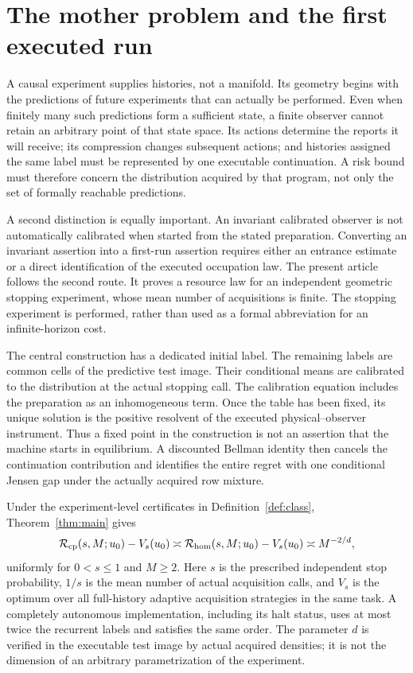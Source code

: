\section{The mother problem and the first executed run}\label{sec:introduction}
A causal experiment supplies histories, not a manifold. Its geometry begins with the predictions of future experiments that can actually be performed. Even when finitely many such predictions form a sufficient state, a finite observer cannot retain an arbitrary point of that state space. Its actions determine the reports it will receive; its compression changes subsequent actions; and histories assigned the same label must be represented by one executable continuation. A risk bound must therefore concern the distribution acquired by that program, not only the set of formally reachable predictions.

A second distinction is equally important. An invariant calibrated observer is not automatically calibrated when started from the stated preparation. Converting an invariant assertion into a first-run assertion requires either an entrance estimate or a direct identification of the executed occupation law. The present article follows the second route. It proves a resource law for an independent geometric stopping experiment, whose mean number of acquisitions is finite. The stopping experiment is performed, rather than used as a formal abbreviation for an infinite-horizon cost.

The central construction has a dedicated initial label. The remaining labels are common cells of the predictive test image. Their conditional means are calibrated to the distribution at the actual stopping call. The calibration equation includes the preparation as an inhomogeneous term. Once the table has been fixed, its unique solution is the positive resolvent of the executed physical--observer instrument. Thus a fixed point in the construction is not an assertion that the machine starts in equilibrium. A discounted Bellman identity then cancels the continuation contribution and identifies the entire regret with one conditional Jensen gap under the actually acquired row mixture.

Under the experiment-level certificates in Definition~\ref{def:class}, Theorem~\ref{thm:main} gives
\[
 \mathcal R_{\rm cp}(s,M;u_0)-V_s(u_0)
 \asymp \mathcal R_{\rm hom}(s,M;u_0)-V_s(u_0)
 \asymp M^{-2/d},
\]
uniformly for $0<s\le1$ and $M\ge2$. Here $s$ is the prescribed independent stop probability, $1/s$ is the mean number of actual acquisition calls, and $V_s$ is the optimum over all full-history adaptive acquisition strategies in the same task. A completely autonomous implementation, including its halt status, uses at most twice the recurrent labels and satisfies the same order. The parameter $d$ is verified in the executable test image by actual acquired densities; it is not the dimension of an arbitrary parametrization of the experiment.

